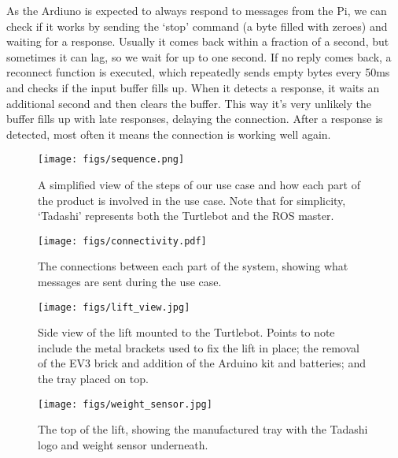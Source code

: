 \documentclass{article}
\begin{document}
As the Ardiuno is expected to always respond to messages from the Pi, we can check if it works by sending the `stop' command (a byte filled with zeroes) and waiting for a response. Usually it comes back within a fraction of a second, but sometimes it can lag, so we wait for up to one second. If no reply comes back, a reconnect function is executed, which repeatedly sends empty bytes every 50ms and checks if the input buffer fills up. When it detects a response, it waits an additional second and then clears the buffer. This way it's very unlikely the buffer fills up with late responses, delaying the connection. After a response is detected, most often it means the connection is working well again.

\begin{figure*}
  \begin{center}
    \texttt{[image: figs/sequence.png]}
  \end{center}
  \caption{A simplified view of the steps of our use case and how each part of the product is involved in the use case. Note that for simplicity, `Tadashi' represents both the Turtlebot and the ROS master.}
  \label{fig:seq}
\end{figure*}
\begin{figure*}
  \begin{center}
    \texttt{[image: figs/connectivity.pdf]}
  \end{center}
  \caption{The connections between each part of the system, showing what messages are sent during the use case.}
  \label{fig:connect-larger}
\end{figure*}

\begin{figure}
  \begin{center}
    \texttt{[image: figs/lift\_view.jpg]}
    \caption{Side view of the lift mounted to the Turtlebot. Points to note include the metal brackets used to fix the lift in place; the removal of the EV3 brick and addition of the Arduino kit and batteries; and the tray placed on top.}
  \label{fig:lift}
  \end{center}
\end{figure}

\begin{figure}
  \begin{center}
    \texttt{[image: figs/weight\_sensor.jpg]}
    \caption{The top of the lift, showing the manufactured tray with the Tadashi logo and weight sensor underneath.}
  \label{fig:sensor}
  \end{center}
\end{figure}
\end{document}

